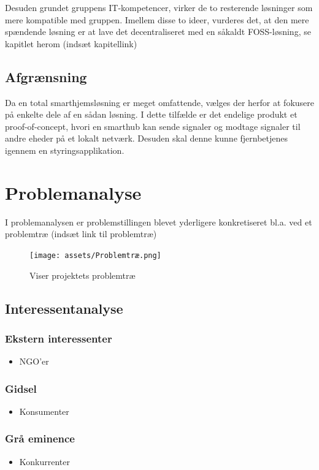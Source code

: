 \documentclass[11pt]{article}
\begin{document}
Desuden grundet gruppens IT-kompetencer, virker de to resterende løsninger som mere kompatible med gruppen. Imellem disse to ideer, vurderes det, at den mere spændende løsning er at lave det decentraliseret med en såkaldt FOSS-løsning, se kapitlet herom (indsæt kapitellink)
\subsection{Afgrænsning}
\label{sec:orgc46d8ef}
Da en total smarthjemsløsning er meget omfattende, vælges der herfor at fokusere på enkelte dele af en sådan løsning. I dette tilfælde er det endelige produkt et proof-of-concept, hvori en smarthub kan sende signaler og modtage signaler til andre eheder på et lokalt netværk. Desuden skal denne kunne fjernbetjenes igennem en styringsapplikation.
\newpage

\section{Problemanalyse}
\label{sec:org3679584}

I problemanalysen er problemstillingen blevet yderligere konkretiseret bl.a. ved et problemtræ (indsæt link til problemtræ)
\begin{figure}[htbp]
\centering
\texttt{[image: assets/Problemtræ.png]}
\caption{Viser projektets problemtræ}
\end{figure}
\subsection{Interessentanalyse}
\label{sec:org976cef3}
\subsubsection{Ekstern interessenter}
\label{sec:orgf2dab0a}
\begin{itemize}
\item NGO'er
\end{itemize}
\subsubsection{Gidsel}
\label{sec:org34c7521}
\begin{itemize}
\item Konsumenter
\end{itemize}
\subsubsection{Grå eminence}
\label{sec:orgaa235ac}
\begin{itemize}
\item Konkurrenter
\end{itemize}
\end{document}
